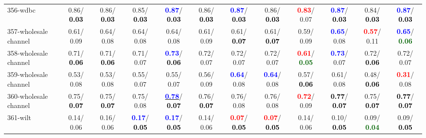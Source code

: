 \begin{table}[h]
\begin{center}
{\begin{tabular}{lc|c|c|c|c|c|c|c|c|c|c}
356-wdbc &   0.86/\textcolor{black}{\textbf{  0.03}} &   0.86/\textcolor{black}{\textbf{  0.03}} &   0.85/\textcolor{black}{\textbf{  0.03}} & \textcolor{blue}{\textbf{  0.87}}/\textcolor{black}{\textbf{  0.03}} &   0.86/\textcolor{black}{\textbf{  0.03}} & \textcolor{blue}{\textbf{  0.87}}/\textcolor{black}{\textbf{  0.03}} &   0.86/\textcolor{black}{\textbf{  0.03}} & \textcolor{red}{\textbf{  0.83}}/  0.07 & \textcolor{blue}{\textbf{  0.87}}/\textcolor{black}{\textbf{  0.03}} &   0.84/\textcolor{black}{\textbf{  0.03}} & \textcolor{blue}{\textbf{  0.87}}/\textcolor{black}{\textbf{  0.03}} \\
357-wholesale channel &   0.61/  0.09 &   0.64/  0.08 &   0.64/  0.08 &   0.64/  0.08 &   0.61/  0.09 &   0.61/\textcolor{black}{\textbf{  0.07}} &   0.61/\textcolor{black}{\textbf{  0.07}} &   0.59/  0.09 & \textcolor{blue}{\textbf{  0.65}}/  0.08 & \textcolor{red}{\textbf{  0.57}}/  0.11 & \textcolor{blue}{\textbf{  0.65}}/\textcolor{darkgreen}{\textbf{  0.06}} \\
358-wholesale channel &   0.71/\textcolor{black}{\textbf{  0.06}} &   0.71/\textcolor{black}{\textbf{  0.06}} &   0.71/  0.07 & \textcolor{blue}{\textbf{  0.73}}/\textcolor{black}{\textbf{  0.06}} &   0.72/  0.07 &   0.72/  0.07 &   0.72/  0.07 & \textcolor{red}{\textbf{  0.61}}/\textcolor{darkgreen}{\textbf{  0.05}} & \textcolor{blue}{\textbf{  0.73}}/  0.07 &   0.72/\textcolor{black}{\textbf{  0.06}} &   0.72/  0.07 \\
359-wholesale channel &   0.53/  0.08 &   0.53/  0.08 &   0.55/  0.07 &   0.55/  0.07 &   0.56/  0.09 & \textcolor{blue}{\textbf{  0.64}}/  0.08 & \textcolor{blue}{\textbf{  0.64}}/  0.08 &   0.57/\textcolor{black}{\textbf{  0.06}} &   0.61/  0.08 &   0.48/\textcolor{black}{\textbf{  0.06}} & \textcolor{red}{\textbf{  0.31}}/  0.08 \\ \hline
360-wholesale channel &   0.75/\textcolor{black}{\textbf{  0.07}} &   0.75/\textcolor{black}{\textbf{  0.07}} &   0.75/  0.08 & \underline{\textcolor{blue}{\textbf{  0.78}}}/\textcolor{black}{\textbf{  0.07}} &   0.76/\textcolor{black}{\textbf{  0.07}} &   0.76/  0.08 &   0.76/  0.08 & \textcolor{red}{\textbf{  0.72}}/  0.09 & \textcolor{black}{\textbf{  0.77}}/\textcolor{black}{\textbf{  0.07}} &   0.75/\textcolor{black}{\textbf{  0.07}} & \textcolor{black}{\textbf{  0.77}}/\textcolor{black}{\textbf{  0.07}} \\
361-wilt &   0.14/  0.06 &   0.16/  0.06 & \textcolor{blue}{\textbf{  0.17}}/\textcolor{black}{\textbf{  0.05}} & \textcolor{blue}{\textbf{  0.17}}/\textcolor{black}{\textbf{  0.05}} &   0.14/  0.06 & \textcolor{red}{\textbf{  0.07}}/\textcolor{black}{\textbf{  0.05}} & \textcolor{red}{\textbf{  0.07}}/\textcolor{black}{\textbf{  0.05}} &   0.14/  0.06 &   0.10/\textcolor{black}{\textbf{  0.05}} &   0.09/\textcolor{darkgreen}{\textbf{  0.04}} &   0.09/\textcolor{black}{\textbf{  0.05}} \\

\end{tabular}}
\end{center}
\end{table}
